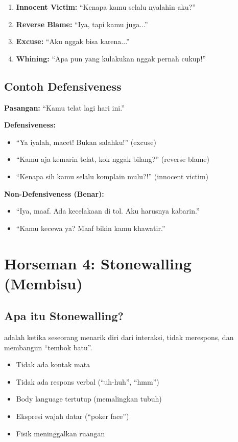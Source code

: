 \begin{enumerate}
    \item \textbf{Innocent Victim:} ``Kenapa kamu selalu nyalahin aku?''
    \item \textbf{Reverse Blame:} ``Iya, tapi kamu juga...''
    \item \textbf{Excuse:} ``Aku nggak bisa karena...''
    \item \textbf{Whining:} ``Apa pun yang kulakukan nggak pernah cukup!''
\end{enumerate}

\subsection{Contoh Defensiveness}

\begin{praktikbox}
\textbf{Pasangan:} ``Kamu telat lagi hari ini.''

\textbf{Defensiveness:}
\begin{itemize}
    \item ``Ya iyalah, macet! Bukan salahku!'' (excuse)
    \item ``Kamu aja kemarin telat, kok nggak bilang?'' (reverse blame)
    \item ``Kenapa sih kamu selalu komplain mulu?!'' (innocent victim)
\end{itemize}

\textbf{Non-Defensiveness (Benar):}
\begin{itemize}
    \item ``Iya, maaf. Ada kecelakaan di tol. Aku harusnya kabarin.''
    \item ``Kamu kecewa ya? Maaf bikin kamu khawatir.''
\end{itemize}
\end{praktikbox}

\section{Horseman 4: Stonewalling (Membisu)}

\subsection{Apa itu Stonewalling?}

 adalah ketika seseorang menarik diri dari interaksi, tidak merespons, dan membangun ``tembok batu''.

\begin{warningbox}
\begin{itemize}
    \item Tidak ada kontak mata
    \item Tidak ada respons verbal (``uh-huh'', ``hmm'')
    \item Body language tertutup (memalingkan tubuh)
    \item Ekspresi wajah datar (``poker face'')
    \item Fisik meninggalkan ruangan
\end{itemize}
\end{warningbox}

